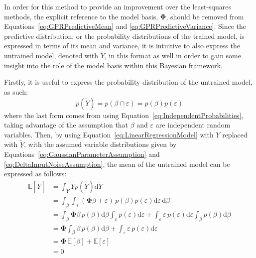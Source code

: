 \documentclass{article}
\begin{document}
In order for this method to provide an improvement over the least-squares methods, the explicit reference to the model basis, $\mathbf{\Phi}$, should be removed from Equations~\eqref{eq:GPRPredictiveMean} and \eqref{eq:GPRPredictiveVariance}. Since the predictive distribution, or the probability distributions of the trained model, is expressed in terms of its mean and variance, it is intuitive to also express the untrained model, denoted with $\widetilde{Y}$, in this format as well in order to gain some insight into the role of the model basis within this Bayesian framework.

Firstly, it is useful to express the probability distribution of the untrained model, as such:
\begin{equation}
\label{eq:GPRUntrainedProbability}
	p\!\left(\widetilde{Y}\right) = p\!\left(\beta \cap \varepsilon\right) = p\!\left(\beta\right) p\!\left(\varepsilon\right)
\end{equation}
where the last form comes from using Equation~\eqref{eq:IndependentProbabilities}, taking advantage of the assumption that $\beta$ and $\varepsilon$ are independent random variables. Then, by using Equation~\eqref{eq:LinearRegressionModel} with $Y$ replaced with $\widetilde{Y}$, with the assumed variable distributions given by Equations~\eqref{eq:GaussianParameterAssumption} and \eqref{eq:DeltaInputNoiseAssumption}, the mean of the untrained model can be expressed as follows:
\begin{equation}
\label{eq:GPRUntrainedMean}
	\begin{aligned}
	\mathbb{E}\!\left[\widetilde{Y}\right] &= \int_{\widetilde{Y}} \widetilde{Y} p\!\left(\widetilde{Y}\right) \text{d}\widetilde{Y} \\
	&= \int_{\beta} \int_{\varepsilon} \left(\mathbf{\Phi} \beta + \varepsilon\right) \, p\!\left(\beta\right) p\!\left(\varepsilon\right) \text{d}\varepsilon \, \text{d}\beta \\
	&= \int_{\beta} \mathbf{\Phi} \beta \, p\!\left(\beta\right) \text{d}\beta \int_{\varepsilon} p\!\left(\varepsilon\right) \text{d}\varepsilon + \int_{\varepsilon} \varepsilon \, p\!\left(\varepsilon\right) \text{d}\varepsilon \int_{\beta} p\!\left(\beta\right) \text{d}\beta \\
	&= \mathbf{\Phi} \int_{\beta} \beta \, p\!\left(\beta\right) \text{d}\beta + \int_{\varepsilon} \varepsilon \, p\!\left(\varepsilon\right) \text{d}\varepsilon \\
	&= \mathbf{\Phi} \, \mathbb{E}\!\left[\beta\right] + \mathbb{E}\!\left[\varepsilon\right] \\
	&= 0
	\end{aligned}
\end{equation}
\end{document}
